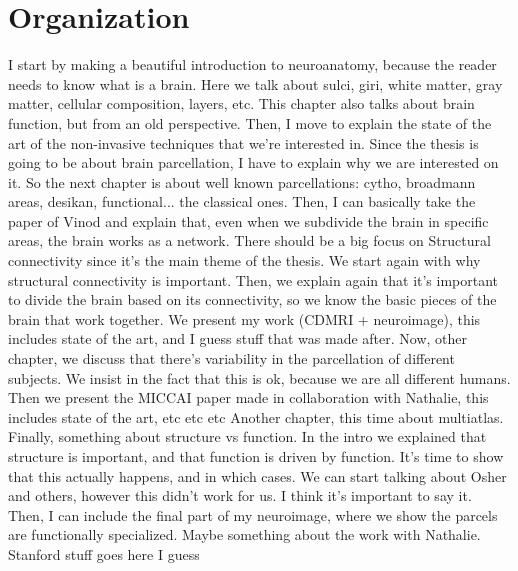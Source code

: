 \section{Organization}
I start by making a beautiful introduction to neuroanatomy, because the reader needs to know what is a brain.
Here we talk about sulci, giri, white matter, gray matter, cellular composition, layers, etc.
This chapter also talks about brain function, but from an old perspective.
Then, I move to explain the state of the art of the non-invasive techniques that we're interested in.
Since the thesis is going to be about brain parcellation, I have to explain why we are interested on it.
So the next chapter is about well known parcellations: cytho, broadmann areas, desikan, functional... the classical ones.
Then, I can basically take the paper of Vinod and explain that, even when we subdivide the brain in specific areas, the brain works as a network.
There should be a big focus on Structural connectivity since it's the main theme of the thesis.
We start again with why structural connectivity is important.
Then, we explain again that it's important to divide the brain based on its connectivity, so we know the basic pieces of the brain that work together.
We present my work (CDMRI + neuroimage), this includes state of the art, and I guess stuff that was made after.
Now, other chapter, we discuss that there's variability in the parcellation of different subjects.
We insist in the fact that this is ok, because we are all different humans. 
Then we present the MICCAI paper made in collaboration with Nathalie, this includes state of the art, etc etc etc
%
Another chapter, this time about multiatlas.
Finally, something about structure vs function.
In the intro we explained that structure is important, and that function is driven by function.
It's time to show that this actually happens, and in which cases.
We can start talking about Osher and others, however this didn't work for us.
I think it's important to say it.
Then, I can include the final part of my neuroimage, where we show the parcels are functionally specialized.
Maybe something about the work with Nathalie.
Stanford stuff goes here I guess
%



